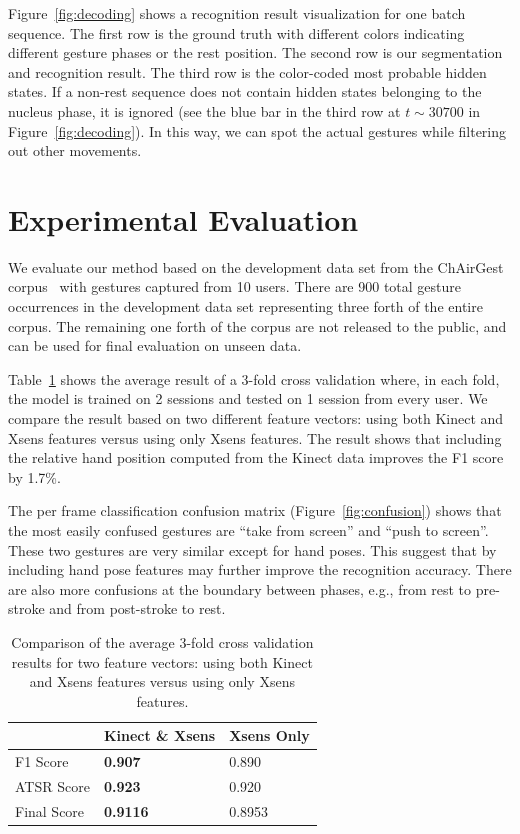 \documentclass{sig-alternate-2013}
\begin{document}
Figure~\ref{fig:decoding} shows a recognition result visualization for one batch sequence. The first
row is the ground truth with different colors indicating different gesture phases or the rest position. 
The second row is our segmentation and recognition result.
The third row is the color-coded most probable hidden states. If a non-rest sequence does not contain hidden states belonging to the nucleus phase, 
it is ignored (see the blue bar in the third row at $t\sim 30700$ in Figure~\ref{fig:decoding}). In
this way, we can spot the actual gestures while filtering out other movements.

\section{Experimental Evaluation}\label{sec:eval}
We evaluate our method based on the development data set from the ChAirGest
corpus~\cite{Ruffieux2013} with gestures captured from 10 users. There are 900
total gesture occurrences in the development data set representing three forth
of the entire corpus. The remaining one forth of the corpus are not released to
the public, and can be used for final evaluation on unseen data.

Table~\ref{tab:comp-feature} shows the average result of a 3-fold cross validation where, in each fold,
the model is trained on 2 sessions and tested on 1 session from every user. We compare
the result based on two different feature vectors: using both Kinect and Xsens features versus using
only Xsens features. The result shows that including the relative hand position computed from 
the Kinect data improves the F1 score by 1.7\%. 

The per frame classification confusion matrix (Figure~\ref{fig:confusion}) shows that the most easily confused gestures
are ``take from screen'' and ``push to screen''. These two gestures are very similar except for hand
poses. This suggest that by including hand pose features may further improve
the recognition accuracy. There are also more confusions at the boundary between phases, e.g., 
from rest to pre-stroke and from post-stroke to rest.

\begin{table}[tb]
\begin{center}
\begin{tabular}{|l|l|l|}
\hline
 & Kinect \& Xsens & Xsens Only \\
\hline
F1 Score & \textbf{0.907} & 0.890 \\
\hline
ATSR Score & \textbf{0.923} & 0.920 \\
\hline
Final Score & \textbf{0.9116} & 0.8953 \\
\hline
\end{tabular}
\caption{Comparison of the average 3-fold cross validation results for two feature vectors:
using both Kinect and Xsens features versus using only Xsens features. }
\label{tab:comp-feature}
\end{center}
\end{table}
\end{document}
